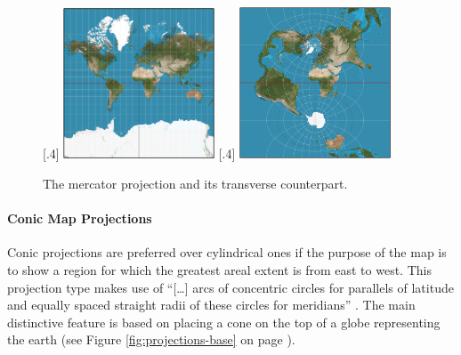 \begin{figure}[!htb]
    \centering
  [.4\linewidth]
    {
        \includegraphics[width=0.4\textwidth,keepaspectratio]
        {images/methods/projections/mercator.png}
    }
    \qquad
    [.4\linewidth]
    {
        \includegraphics[width=0.4\textwidth,keepaspectratio]
        {images/methods/projections/mercator-transverse.png}
    }

    \caption{The mercator projection and its transverse counterpart.}
\end{figure}

\paragraph{Conic Map Projections}
Conic projections are preferred over cylindrical ones if the purpose of the map is to show a region for which the greatest areal extent is from east to west. This projection type makes use of ``[\ldots] arcs of concentric circles for parallels of latitude and equally spaced straight radii of these circles for meridians'' . The main distinctive feature is based on placing a cone on the top of a globe representing the earth (see Figure \ref{fig:projections-base} on page \pageref{fig:projections-base}).

